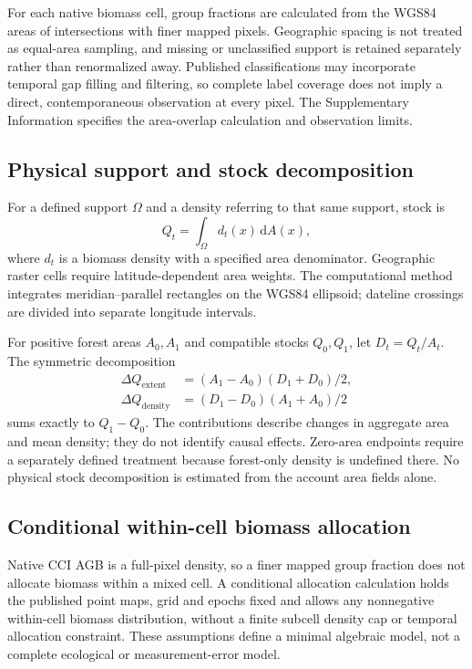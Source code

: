 \documentclass[11pt,a4paper]{article}
\begin{document}
For each native biomass cell, group fractions are calculated from the WGS84 areas of intersections with finer mapped pixels. Geographic spacing is not treated as equal-area sampling, and missing or unclassified support is retained separately rather than renormalized away. Published classifications may incorporate temporal gap filling and filtering, so complete label coverage does not imply a direct, contemporaneous observation at every pixel. The Supplementary Information specifies the area-overlap calculation and observation limits.

\subsection{Physical support and stock decomposition}
For a defined support $\Omega$ and a density referring to that same support, stock is
\[
Q_t=\int_{\Omega} d_t(x)\,\mathrm dA(x),
\]
where $d_t$ is a biomass density with a specified area denominator. Geographic raster cells require latitude-dependent area weights. The computational method integrates meridian--parallel rectangles on the WGS84 ellipsoid; dateline crossings are divided into separate longitude intervals.

For positive forest areas $A_0,A_1$ and compatible stocks $Q_0,Q_1$, let $D_t=Q_t/A_t$. The symmetric decomposition
\begin{align}
\Delta Q_{\mathrm{extent}}&=(A_1-A_0)(D_1+D_0)/2,\label{eq:extent}\\
\Delta Q_{\mathrm{density}}&=(D_1-D_0)(A_1+A_0)/2\label{eq:density}
\end{align}
sums exactly to $Q_1-Q_0$. The contributions describe changes in aggregate area and mean density; they do not identify causal effects. Zero-area endpoints require a separately defined treatment because forest-only density is undefined there. No physical stock decomposition is estimated from the account area fields alone.

\subsection{Conditional within-cell biomass allocation}
Native CCI AGB is a full-pixel density, so a finer mapped group fraction does not allocate biomass within a mixed cell. A conditional allocation calculation holds the published point maps, grid and epochs fixed and allows any nonnegative within-cell biomass distribution, without a finite subcell density cap or temporal allocation constraint. These assumptions define a minimal algebraic model, not a complete ecological or measurement-error model.
\end{document}
